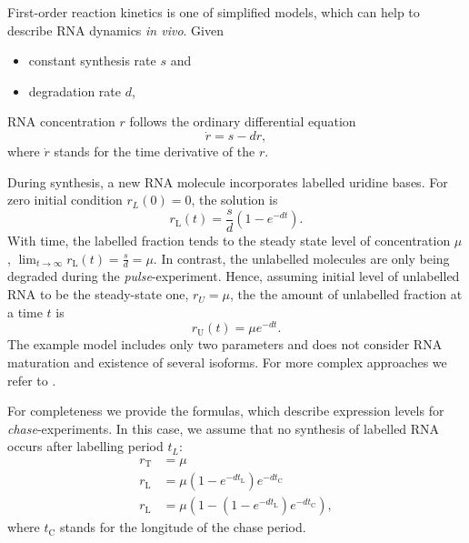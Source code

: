 First-order reaction kinetics  is one of simplified models,
which can help to describe RNA dynamics \emph{in vivo}\cite{A}.
Given
\begin{itemize}
 \item constant synthesis rate $s$ and
\item degradation rate $d$, 
\end{itemize}
RNA concentration $r$ follows the ordinary differential equation
\begin{equation}
 \dot{r} = s - dr,
\end{equation}
where $\dot{r}$ stands for the time derivative of the $r$\cite{A}.
\par
During synthesis, a new RNA molecule incorporates labelled uridine bases\cite{A}.
For zero initial condition $r_L(0) = 0$, the solution is
\begin{equation}
 r_\text{L}(t) = \frac{s}{d}\left(1 - e^{-dt}\right).
\end{equation}
With time, the labelled fraction tends to the steady state level of concentration $\mu$,
$\lim_{t\to\infty} r_\text{L}(t) = \frac{s}{d} = \mu$.
In contrast, the unlabelled molecules are only being degraded during the \emph{pulse}-experiment.
Hence, assuming initial level of unlabelled RNA to be the steady-state one, $r_U = \mu$,
the the amount of unlabelled fraction at a time $t$ is
\begin{equation}
 r_\text{U}(t) = \mu e^{-dt}.
\end{equation}
The example model includes only two parameters and does not consider
RNA maturation and existence of several isoforms. For more complex approaches we refer to \cite{A}.
\par For completeness we provide the formulas, which describe expression levels for \emph{chase}-experiments.
In this case, we assume that no synthesis of labelled RNA occurs after labelling period $t_L$:
\begin{align}
 r_\text{T}&=\mu\\
 r_\text{L}&=\mu \left(1-e^{-dt_\text{L}}\right)e^{-dt_\text{C}}\\
 r_\text{L}&=\mu \left(1-\left(1-e^{-dt_\text{L}}\right)e^{-dt_\text{C}}\right),
\end{align}
where $t_\text{C}$ stands for the longitude of the chase period.
\par

% 
